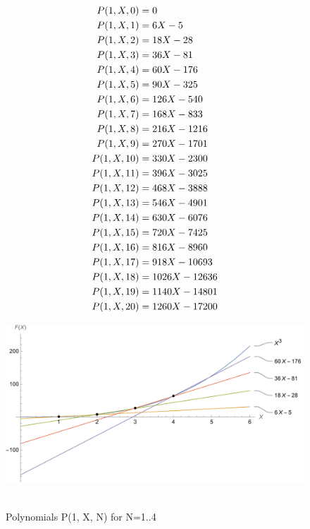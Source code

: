 ﻿\begin{align*}
    {P}(1,X,0) &= 0 \\
    {P}(1,X,1) &= 6X - 5 \\
    {P}(1,X,2) &= 18X - 28 \\
    {P}(1,X,3) &= 36X - 81 \\
    {P}(1,X,4) &= 60X - 176 \\
    {P}(1,X,5) &= 90X - 325 \\
    {P}(1,X,6) &= 126X - 540 \\
    {P}(1,X,7) &= 168X - 833 \\
    {P}(1,X,8) &= 216X - 1216 \\
    {P}(1,X,9) &= 270X - 1701 \\
    {P}(1,X,10) &= 330X - 2300 \\
    {P}(1,X,11) &= 396X - 3025 \\
    {P}(1,X,12) &= 468X - 3888 \\
    {P}(1,X,13) &= 546X - 4901 \\
    {P}(1,X,14) &= 630X - 6076 \\
    {P}(1,X,15) &= 720X - 7425 \\
    {P}(1,X,16) &= 816X - 8960 \\
    {P}(1,X,17) &= 918X - 10693 \\
    {P}(1,X,18) &= 1026X - 12636 \\
    {P}(1,X,19) &= 1140X - 14801 \\
    {P}(1,X,20) &= 1260X - 17200
\end{align*}
\begin{figure}[H]
    \centering
    \includegraphics[width=1\textwidth]{sections/images/01_cubes_with_p_1_n_k}
    ~\caption{Polynomials P(1, X, N) for N=1..4}\label{fig:figure}
\end{figure}
